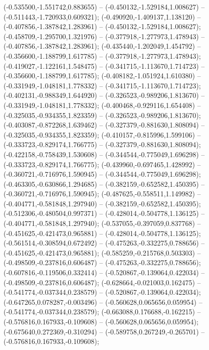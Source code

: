  (-0.535500,-1.551742,0.883655) -- (-0.450132,-1.529184,1.008627) -- (-0.511443,-1.720933,0.609321);
 (-0.490920,-1.409137,1.138120) -- (-0.407856,-1.387842,1.283961) -- (-0.450132,-1.529184,1.008627);
 (-0.458709,-1.295700,1.321976) -- (-0.377918,-1.277973,1.478943) -- (-0.407856,-1.387842,1.283961);
 (-0.435440,-1.202049,1.454792) -- (-0.356600,-1.188799,1.617785) -- (-0.377918,-1.277973,1.478943);
 (-0.419027,-1.122161,1.548475) -- (-0.341715,-1.113670,1.714723) -- (-0.356600,-1.188799,1.617785);
 (-0.408182,-1.051924,1.610380) -- (-0.331949,-1.048181,1.778332) -- (-0.341715,-1.113670,1.714723);
 (-0.402131,-0.988349,1.644920) -- (-0.326523,-0.989206,1.813670) -- (-0.331949,-1.048181,1.778332);
 (-0.400468,-0.929116,1.654408) -- (-0.325035,-0.934355,1.823359) -- (-0.326523,-0.989206,1.813670);
 (-0.403087,-0.872268,1.639462) -- (-0.327379,-0.881630,1.808094) -- (-0.325035,-0.934355,1.823359);
 (-0.410157,-0.815996,1.599106) -- (-0.333723,-0.829174,1.766775) -- (-0.327379,-0.881630,1.808094);
 (-0.422158,-0.758439,1.530608) -- (-0.344544,-0.775049,1.696298) -- (-0.333723,-0.829174,1.766775);
 (-0.439960,-0.697465,1.428992) -- (-0.360721,-0.716976,1.590945) -- (-0.344544,-0.775049,1.696298);
 (-0.463305,-0.630866,1.294685) -- (-0.382159,-0.652582,1.450395) -- (-0.360721,-0.716976,1.590945);
 (-0.487625,-0.558511,1.149982) -- (-0.404771,-0.581848,1.297940) -- (-0.382159,-0.652582,1.450395);
 (-0.512306,-0.480504,0.997371) -- (-0.428014,-0.504778,1.136125) -- (-0.404771,-0.581848,1.297940);
 (-0.537055,-0.397059,0.837768) -- (-0.451625,-0.421473,0.965881) -- (-0.428014,-0.504778,1.136125);
 (-0.561514,-0.308594,0.672492) -- (-0.475263,-0.332275,0.788656) -- (-0.451625,-0.421473,0.965881);
 (-0.585259,-0.215768,0.503303) -- (-0.498509,-0.237816,0.606487) -- (-0.475263,-0.332275,0.788656);
 (-0.607816,-0.119506,0.332414) -- (-0.520867,-0.139064,0.422034) -- (-0.498509,-0.237816,0.606487);
 (-0.628664,-0.021003,0.162475) -- (-0.541774,-0.037344,0.238579) -- (-0.520867,-0.139064,0.422034);
 (-0.647265,0.078287,-0.003496) -- (-0.560628,0.065656,0.059954) -- (-0.541774,-0.037344,0.238579);
 (-0.663088,0.176688,-0.162215) -- (-0.576816,0.167933,-0.109608) -- (-0.560628,0.065656,0.059954);
 (-0.675640,0.272369,-0.310294) -- (-0.589758,0.267249,-0.265701) -- (-0.576816,0.167933,-0.109608);
